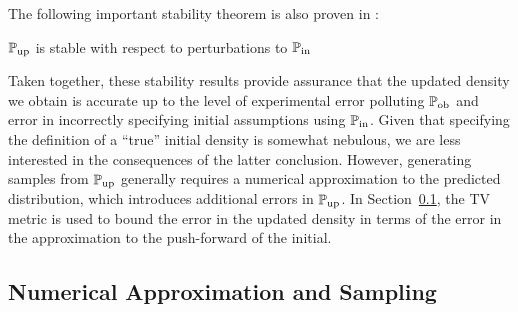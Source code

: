 The following important stability theorem is also proven in \cite{BJW18a}:

\begin{thm}
  $\operatorname*{\mathbb{P}_{up}}$ is stable with respect to perturbations to $\operatorname*{\mathbb{P}_{in}}$
  \label{thm:stableinitial}
\end{thm}

Taken together, these stability results provide assurance that the updated density we obtain is accurate up to the level of experimental error polluting $\operatorname*{\mathbb{P}_{ob}}$ and error in incorrectly specifying initial assumptions using $\operatorname*{\mathbb{P}_{in}}$.
Given that specifying the definition of a ``true'' initial density is somewhat nebulous, we are less interested in the consequences of the latter conclusion.
However, generating samples from $\operatorname*{\mathbb{P}_{up}}$ generally requires a numerical approximation to the predicted distribution, which introduces additional errors in $\operatorname*{\mathbb{P}_{up}}$.
In Section~\ref{sec:approx}, the TV metric is used to bound the error in the updated density in terms of the error in the approximation to the push-forward of the initial.




\subsection{Numerical Approximation and Sampling}\label{sec:approx}
%
%
%
%


